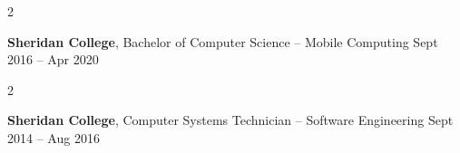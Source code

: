 \documentclass[11pt, letterpaper]{article}
\newenvironment{twocolentry}[2][]{
\onecolentry
\def\secondColumn{#2}
\setcolumnwidth{\fill, 4.5 cm}
\begin{paracol}{2}
}{
\switchcolumn \raggedleft \secondColumn
\end{paracol}
\endonecolentry
} %
\begin{document}
\begin{twocolentry}{Sept 2016 – Apr 2020}
\textbf{Sheridan College}, Bachelor of Computer Science – Mobile Computing \end{twocolentry}

\vspace{0.10 cm}

\begin{twocolentry}{Sept 2014 – Aug 2016}
\textbf{Sheridan College}, Computer Systems Technician – Software Engineering\end{twocolentry}

\vspace{0.10 cm}
\end{document}

